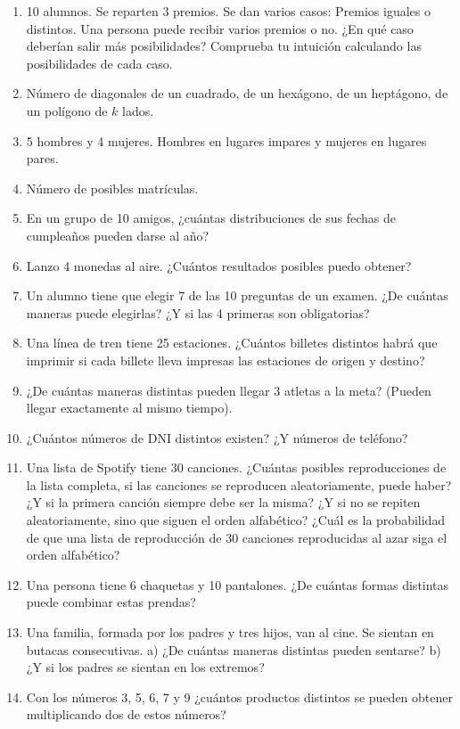 \begin{enumerate}
	\item 10 alumnos. Se reparten 3 premios. Se dan varios casos: Premios iguales o distintos. Una persona puede recibir varios premios o no.
	\subitem ¿En qué caso deberían salir más posibilidades?
	\subitem Comprueba tu intuición calculando las posibilidades de cada caso.
	\item Número de diagonales de un cuadrado, de un hexágono, de un heptágono, de un polígono de $k$ lados.
	\item 5 hombres y 4 mujeres. Hombres en lugares impares y mujeres en lugares pares.
	\item Número de posibles matrículas.
	\item En un grupo de 10 amigos, ¿cuántas distribuciones de sus fechas de cumpleaños pueden darse al año?
	\item Lanzo 4 monedas al aire. ¿Cuántos resultados posibles puedo obtener?
	\item Un alumno tiene que elegir 7 de las 10 preguntas de un examen. ¿De cuántas maneras puede elegirlas? ¿Y si las 4 primeras son obligatorias?
	\item Una línea de tren tiene 25 estaciones. ¿Cuántos billetes distintos habrá que imprimir si cada billete lleva impresas las estaciones de origen y destino?
	\item ¿De cuántas maneras distintas pueden llegar 3 atletas a la meta? (Pueden llegar exactamente al mismo tiempo).
	\item ¿Cuántos números de DNI distintos existen? ¿Y números de teléfono?
	\item Una lista de Spotify tiene 30 canciones. ¿Cuántas posibles reproducciones de la lista completa, si las canciones se reproducen aleatoriamente, puede haber? ¿Y si la primera canción siempre debe ser la misma? ¿Y si no se repiten aleatoriamente, sino que siguen el orden alfabético?
	\subitem ¿Cuál es la probabilidad de que una lista de reproducción de 30 canciones reproducidas al azar siga el orden alfabético?
	\item Una persona tiene 6 chaquetas y 10 pantalones. ¿De cuántas formas distintas puede combinar estas prendas?
	\item Una familia, formada por los padres y tres hijos, van al cine. Se sientan en butacas consecutivas.
		\subitem a) ¿De cuántas maneras distintas pueden sentarse?
		\subitem b) ¿Y si los padres se sientan en los extremos?
	\item Con los números 3, 5, 6, 7 y 9 
		\subitem ¿cuántos productos distintos se pueden obtener multiplicando dos de estos números? 

\end{enumerate}
